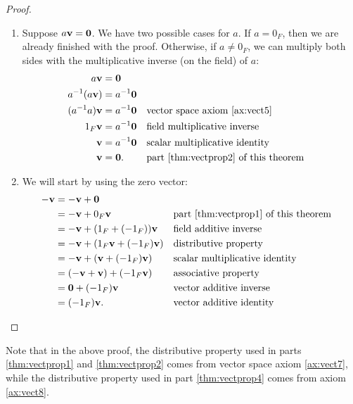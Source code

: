 \begin{proof}
\begin{enumerate}
    \item Suppose $ a\mathbf{v}=\mathbf{0} $. We have two possible cases for $ a $. If $ a=0_F $, then we are already finished with the proof. Otherwise, if $ a\neq 0_F $, we can multiply both sides with the multiplicative inverse (on the field) of $ a $:
    \begin{align*}
        a\mathbf{v} &= \mathbf{0} \\
        a^{-1}(a\mathbf{v}) &= a^{-1}\mathbf{0} \\
        (a^{-1}a)\mathbf{v} &= a^{-1}\mathbf{0} && \text{vector space axiom \ref{ax:vect5}} \\
        1_F\mathbf{v} &= a^{-1}\mathbf{0} && \text{field multiplicative inverse} \\
        \mathbf{v} &= a^{-1}\mathbf{0} && \text{scalar multiplicative identity} \\
        \mathbf{v} &= \mathbf{0}. && \text{part \ref{thm:vectprop2} of this theorem}
    \end{align*}

    \item We will start by using the zero vector:
    \begin{align*}
        -\mathbf{v} &= -\mathbf{v}+\mathbf{0} \\
        &= -\mathbf{v}+0_F\mathbf{v} && \text{part \ref{thm:vectprop1} of this theorem} \\
        &= -\mathbf{v}+(1_F+(-1_F))\mathbf{v} && \text{field additive inverse} \\
        &= -\mathbf{v}+(1_F\mathbf{v}+(-1_F)\mathbf{v}) && \text{distributive property} \\
        &= -\mathbf{v}+(\mathbf{v}+(-1_F)\mathbf{v}) && \text{scalar multiplicative identity} \\
        &= (-\mathbf{v}+\mathbf{v})+(-1_F\mathbf{v}) && \text{associative property} \\
        &= \mathbf{0}+(-1_F)\mathbf{v} && \text{vector additive inverse} \\
        &= (-1_F)\mathbf{v}. && \text{vector additive identity} \qedhere
    \end{align*}
\end{enumerate}
\end{proof}

Note that in the above proof, the distributive property used in parts \ref{thm:vectprop1} and \ref{thm:vectprop2} comes from vector space axiom \ref{ax:vect7}, while the distributive property used in part \ref{thm:vectprop4} comes from axiom \ref{ax:vect8}.

